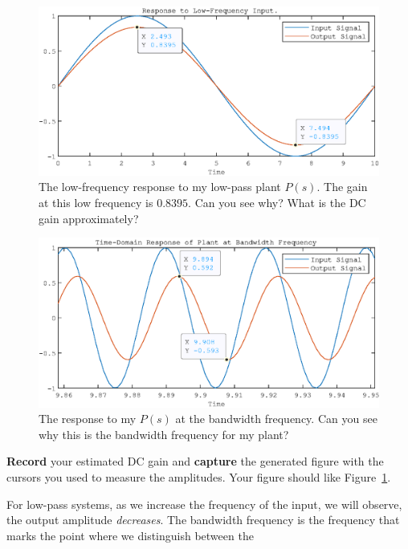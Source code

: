\begin{figure}
  \includegraphics{images/Lab_1_LowFrequency.eps}
  \caption[Low Frequency Response of a Low-Pass Plant]{The low-frequency response to my low-pass plant \(P(s).\) The gain
  at this low frequency is \(0.8395.\) Can you see why? What is the DC
  gain approximately?}
  \label{fig:lab1:lowfreq}
\end{figure}
%
\begin{figure}
  \includegraphics{images/Lab_1_Bandwidth.eps}
  \caption[Time-Domain Response of a First-Order System at the Bandwidth Frequency]{The response to my \(P(s)\) at the bandwidth frequency.
  Can you see why this is the bandwidth frequency for my plant?}
  \label{fig:lab1:bandwidth}
\end{figure}
%
\begin{deliverable}[label={lab1:d1}]
  \textbf{Record} your estimated DC gain and \textbf{capture} the generated
  figure with the cursors you used to measure the amplitudes.
  Your figure should like Figure~\ref{fig:lab1:lowfreq}.
\end{deliverable}
%
For low-pass systems, as we increase the frequency of the input, we will
observe, the output amplitude \emph{decreases}. The bandwidth frequency
is the frequency that marks the point where we distinguish between the

